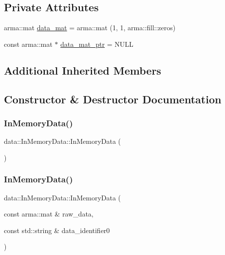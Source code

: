 \subsection*{Private Attributes}
\begin{DoxyCompactItemize}
\item 
arma\+::mat \mbox{\hyperlink{classdata_1_1_in_memory_data_a16d9adacd263125f72fac8717c2ee62b}{data\+\_\+mat}} = arma\+::mat (1, 1, arma\+::fill\+::zeros)
\item 
const arma\+::mat $\ast$ \mbox{\hyperlink{classdata_1_1_in_memory_data_a5c84c30085f5615c9014cba217b6caed}{data\+\_\+mat\+\_\+ptr}} = N\+U\+LL
\end{DoxyCompactItemize}
\subsection*{Additional Inherited Members}


\subsection{Constructor \& Destructor Documentation}
\mbox{\label{classdata_1_1_in_memory_data_a85adf030d1a4a1f31f6d852c41750268}} 
\subsubsection{\texorpdfstring{In\+Memory\+Data()}{InMemoryData()}\hspace{0.1cm}{\footnotesize\ttfamily [1/2]}}
{\footnotesize\ttfamily data\+::\+In\+Memory\+Data\+::\+In\+Memory\+Data (\begin{DoxyParamCaption}{ }\end{DoxyParamCaption})}

\mbox{\label{classdata_1_1_in_memory_data_af9bc156072099d40e45142e4c19f698c}} 
\subsubsection{\texorpdfstring{In\+Memory\+Data()}{InMemoryData()}\hspace{0.1cm}{\footnotesize\ttfamily [2/2]}}
{\footnotesize\ttfamily data\+::\+In\+Memory\+Data\+::\+In\+Memory\+Data (\begin{DoxyParamCaption}\item[{const arma\+::mat \&}]{raw\+\_\+data,  }\item[{const std\+::string \&}]{data\+\_\+identifier0 }\end{DoxyParamCaption})}

